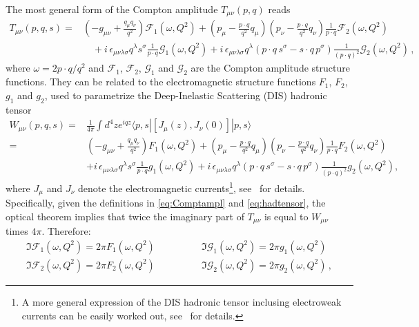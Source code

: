 The most general form of the Compton amplitude $T_{\mu\nu}(p,q)$ reads
\begin{align}
T_{\mu\nu}(p,q,s) 
= {} & 
  \left(-g_{\mu\nu}+\frac{q_\mu q_\nu}{q^2}\right)\mathcal{F}_1(\omega,Q^2) 
+ \left(p_\mu-\frac{p\cdot q}{q^2}q_\mu\right) \left(p_\nu-\frac{p\cdot q}{q^2}q_\nu\right) \frac{1}{p\cdot q} \mathcal{F}_2(\omega,Q^2)
\nonumber\\ 
& {} \quad  
+ i\,\epsilon_{\mu\nu\lambda\sigma}q^\lambda s^\sigma \frac{1}{p\cdot q}\mathcal{G}_1(\omega,Q^2)
+ i\,\epsilon_{\mu\nu\lambda\sigma}q^\lambda \left(p\cdot q\, s^\sigma - s\cdot q\, p^\sigma\right) \frac{1}{(p\cdot q)^2}\mathcal{G}_2(\omega,Q^2)\,,
\label{eq:Comptampl}
\end{align}
where $\omega=2p\cdot q/q^2$ and $\mathcal{F}_1$, $\mathcal{F}_2$, 
$\mathcal{G}_1$ and $\mathcal{G}_2$ are the Compton amplitude structure 
functions.
%
They can be related to the electromagnetic structure functions
$F_1$, $F_2$, $g_1$ and $g_2$, used to parametrize the Deep-Inelastic 
Scattering (DIS) hadronic tensor
\begin{align}
W_{\mu\nu}(p,q,s)
= {} &
\frac{1}{4\pi}\int d^4z e^{iqz}\langle p,s |[J_\mu(z),J_\nu(0)]|p,s\rangle
\nonumber
\\
= {} &
\left(-g_{\mu\nu} +  \frac{q_\mu q_\nu}{q^2}\right) F_1(\omega,Q^2)
+\left( p_\mu - \frac{p\cdot q}{q^2}q_\mu \right)
 \left(p_\nu - \frac{p\cdot q}{q^2}q_\nu \right) \frac{1}{p\cdot q}
F_2(\omega, Q^2)
\nonumber
\\
& +i\,\epsilon_{\mu\nu\lambda\sigma}q^\lambda s^\sigma
\frac{1}{p\cdot q} g_1(\omega,Q^2)
+ i\,\epsilon_{\mu\nu\lambda\sigma}q^\lambda(p\cdot q\, s^\sigma - s\cdot q\, p^\sigma)
\frac{1}{(p\cdot q)^2}g_2(\omega,Q^2),
\label{eq:hadtensor}
\end{align}
where $J_\mu$ and $J_\nu$ denote the electromagnetic currents\footnote{A more
 general expression of the DIS hadronic tensor inclusing electroweak currents
 can be easily worked out, see~\cite{Anselmino:1993tc,Anselmino:1992rn} for 
 details.}, see~\cite{Anselmino:1992rn,Manohar:1992tz} for details.
%
Specifically, given the definitions in \eqref{eq:Comptampl} and 
\eqref{eq:hadtensor}, the optical theorem implies that twice the imaginary 
part of $T_{\mu\nu}$ is equal to $W_{\mu\nu}$ times $4\pi$.
%
Therefore:
\begin{align}
\Im\mathcal{F}_1(\omega, Q^2) = 2\pi F_1(\omega,Q^2)
\qquad \qquad &
\Im\mathcal{G}_1(\omega, Q^2) = 2\pi g_1(\omega,Q^2)
\\
\Im\mathcal{F}_2(\omega, Q^2) = 2\pi F_2(\omega,Q^2)
\qquad \qquad &
\Im\mathcal{G}_2(\omega, Q^2) = 2\pi g_2(\omega,Q^2)\, ,
\end{align}
